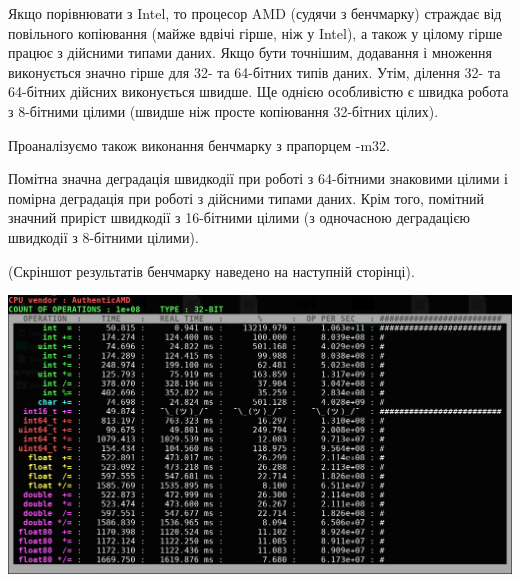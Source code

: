 Якщо порівнювати з Intel, то процесор AMD (судячи з бенчмарку) страждає від повільного копіювання (майже вдвічі гірше, ніж у Intel), а також у цілому гірше працює з дійсними типами даних. Якщо бути точнішим, додавання і множення виконується значно гірше для 32- та 64-бітних типів даних. Утім, ділення 32- та 64-бітних дійсних виконується швидше. Ще однією особливістю є швидка робота з 8-бітними цілими (швидше ніж просте копіювання 32-бітних цілих). 

Проаналізуємо також виконання бенчмарку з прапорцем -m32.

Помітна значна деградація швидкодії при роботі з 64-бітними знаковими цілими і помірна деградація при роботі з дійсними типами даних. Крім того, помітний значний приріст швидкодії з 16-бітними цілими (з одночасною деградацією швидкодії з 8-бітними цілими).

(Скріншот результатів бенчмарку наведено на наступній сторінці).

\includegraphics[width = 16cm]{img/amd32.png}
 



